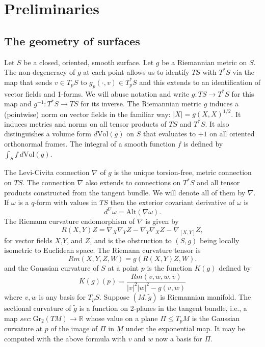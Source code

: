 \documentclass{amsart}
\newcommand{\R}{\mathbb{R}}
\begin{document}
\section{Preliminaries} \label{preliminaries}



\subsection{The geometry of surfaces}



Let $S$ be a closed, oriented, smooth surface. 
Let $g$ be a Riemannian metric on $S$.
The non-degeneracy of $g$ at each point allows us to identify $TS$ with $T^*S$ via the map that sends $v \in T_pS$ to $g_p(\cdot  , v) \in T_p^*S$ and this extends to an identification of vector fields and 1-forms. 
We will abuse notation and write $g: TS \to T^*S$ for this map and $g^{-1}: T^*S \to TS$ for its inverse. 
The Riemannian metric $g$ induces a (pointwise) norm on vector fields in the familiar way: $|X| = g(X,X)^{1/2}$. 
It induces metrics and norms on all tensor products of $TS$ and $T^*S$. It also distinguishes a volume form $d\mathrm{Vol}(g)$ on $S$ that evaluates to $+1$ on all oriented orthonormal frames. 
The integral of a smooth function $f$ is defined by $\int_S f \ d\mathrm{Vol}(g)$.


The Levi-Civita connection $\nabla$ of $g$ is the unique torsion-free, metric connection on $TS$. 
The connection $\nabla$ also extends to connections on $T^*S$ and all tensor products constructed from the tangent bundle.  
We will denote all of them by $\nabla$.
If $\omega$ is a $q$-form with values in $TS$ then the exterior covariant derivative of $\omega$ is 
\[
d^\nabla \omega = \mathrm{Alt}(\nabla \omega).
\]
The Riemann curvature endomorphism of $\nabla$ is given by  
\[
R(X,Y)Z 
= \nabla_X \nabla_Y Z - \nabla_Y \nabla_X Z - \nabla_{[X,Y]}Z,
\]
for vector fields $X$,$Y$, and $Z$, and is the obstruction to $(S,g)$ being locally isometric to Euclidean space. 
The Riemann curvature tensor is 
\[
Rm(X,Y,Z,W) = g(R(X,Y)Z,W).
\]
and the Gaussian curvature of $S$ at a point $p$ is the function $K(g)$ defined by 
\[
K(g)(p) = \frac{Rm(v,w,w,v)}{|v|^2|w|^2 - g(v,w)}
\]
where $v,w$ is any basis for $T_pS$.
Suppose $(M,\tilde{g})$ is Riemannian manifold. 
The sectional curvature of $\tilde{g}$ is a function on 2-planes in the tangent bundle, i.e., a map $sec: \mathrm{Gr}_2(TM) \to \R$ whose value on a plane $\Pi \leq T_pM$ is the Gaussian curvature at $p$ of the image of $\Pi$ in $M$ under the exponential map. 
It may be computed with the above formula with $v$ and $w$ now a basis for $\Pi$.
\end{document}
